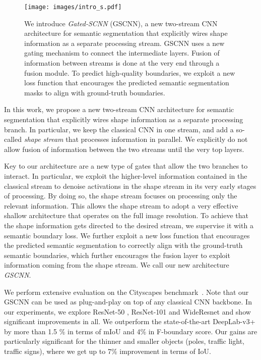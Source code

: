 \documentclass[10pt,twocolumn,letterpaper]{article}
\begin{document}
\begin{figure}[t!]
 
\centering
\texttt{[image: images/intro\_s.pdf]} 
\vspace{-6mm}
\caption{We introduce \emph{Gated-SCNN} (GSCNN), a new two-stream CNN architecture for semantic segmentation that explicitly wires shape information as a separate processing stream. 
GSCNN uses a new gating mechanism to connect the intermediate layers.
Fusion of information between streams is done at the very end through a fusion module.
To predict high-quality boundaries, we exploit a new loss function that encourages the predicted
semantic segmentation masks to align with ground-truth  boundaries.}
\label{fig:teaser}
\vspace{-3mm}
\end{figure}

In this work, we propose a new two-stream CNN architecture for semantic segmentation that explicitly wires shape information as a separate processing branch.  In particular, we keep the classical CNN in one stream, and add a so-called \emph{shape stream} that processes information in parallel. We explicitly do not allow fusion of information between the two streams until the very top layers. 

Key to our architecture are a new type of gates that allow the two branches to interact. In particular, we exploit the higher-level information contained in the classical stream to denoise activations in the shape stream in its very early stages of processing. By doing so, the shape stream focuses on processing only the relevant information. This allows the shape stream to adopt a very effective shallow architecture that operates on the full image resolution. To achieve that the shape information gets directed to the desired stream, we supervise it with a semantic boundary loss. 
We further exploit a new loss function that encourages the predicted semantic segmentation to correctly align with the ground-truth semantic boundaries, which further encourages  the fusion layer to exploit information coming from the shape stream. We call our new architecture \emph{GSCNN}. 

We perform extensive evaluation on the Cityscapes benchmark~\cite{cityscapes}. Note that our GSCNN can be used as plug-and-play on top of any classical CNN backbone. In our experiments, we explore ResNet-50 \cite{he15deepresidual}, ResNet-101 \cite{he15deepresidual} and WideResnet \cite{zagoruyko2016wide} and show significant improvements in all. We outperform the  state-of-the-art DeepLab-v3+\cite{deeplabv3plus2018} by more than 1.5 \% in terms of mIoU 
and 4\% in F-boundary score. Our gains are particularly significant for the thinner and smaller objects (\ie poles, traffic light, traffic signs), where we get up to 7\% improvement in terms of IoU. 
\end{document}
